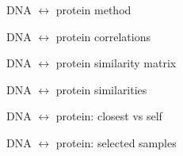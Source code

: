 \documentclass[aspectratio=169,12pt,t]{beamer}
\begin{document}
\begin{frame}[c]{DNA $\leftrightarrow$ protein method}



  \note{
   }

\end{frame}



\begin{frame}[c]{DNA $\leftrightarrow$ protein correlations}


  \note{
  }
\end{frame}


\begin{frame}[c]{DNA $\leftrightarrow$ protein similarity matrix}


  \note{
  }
\end{frame}



\begin{frame}[c]{DNA $\leftrightarrow$ protein similarities}


  \note{
  }
\end{frame}



\begin{frame}[c]{DNA $\leftrightarrow$ protein: closest vs self}


  \note{
  }
\end{frame}






\begin{frame}[c]{DNA $\leftrightarrow$ protein: selected samples}


  \note{
  }
\end{frame}
\end{document}
